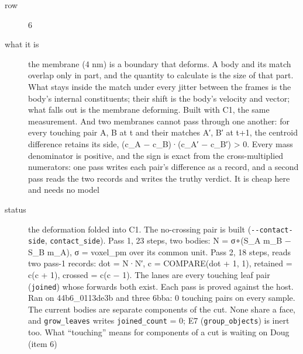 \begin{description}
\item[{row}] 6
\item[{what it is}] the membrane (4 nm) is a boundary that deforms. A body and its match overlap only in part, and the quantity to calculate is the size of that part. What stays inside the match under every jitter between the frames is the body's internal constituents; their shift is the body's velocity and vector; what falls out is the membrane deforming. Built with C1, the same measurement. And two membranes cannot pass through one another: for every touching pair A, B at t and their matches A′, B′ at t+1, the centroid difference retains its side, (c\_\allowbreak{}A − c\_\allowbreak{}B)·(c\_\allowbreak{}A′ − c\_\allowbreak{}B′) > 0. Every mass denominator is positive, and the sign is exact from the cross-multiplied numerators: one pass writes each pair's difference as a record, and a second pass reads the two records and writes the truthy verdict. It is cheap here and needs no model
\item[{status}] the deformation folded into C1. The no-crossing pair is built (\texttt{-\allowbreak{}-\allowbreak{}contact-\allowbreak{}side}, \texttt{contact\_\allowbreak{}side}). Pass 1, 23 steps, two bodies: N = σ∘(S\_\allowbreak{}A m\_\allowbreak{}B − S\_\allowbreak{}B m\_\allowbreak{}A), σ = voxel\_\allowbreak{}pm over its common unit. Pass 2, 18 steps, reads two pass-1 records: dot = N·N′, c = COMPARE(dot + 1, 1), retained = c(c + 1), crossed = c(c − 1). The lanes are every touching leaf pair (\texttt{joined}) whose forwards both exist. Each pass is proved against the host. Ran on 44b6\_\allowbreak{}0113de3b and three 6bba: 0 touching pairs on every sample. The current bodies are separate components of the cut. None share a face, and \texttt{grow\_\allowbreak{}leaves} writes \texttt{joined\_\allowbreak{}count} = 0; E7 (\texttt{group\_\allowbreak{}objects}) is inert too. What “touching” means for components of a cut is waiting on Doug (item 6)
\end{description}

